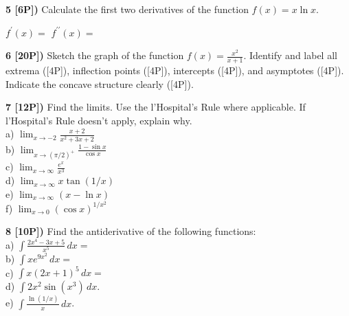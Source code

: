 \documentclass[12pt]{article}
\begin{document}
{\bf 5 [6P])} Calculate the first two derivatives of the function
$f(x) = x \ln x$.


\hfill${\displaystyle f^\prime(x) = }$\hspace{5cm} ${\displaystyle f^{\prime\prime}(x) =
}$\hspace{5cm}\hfill

\vspace{.2in}

{\bf 6 [20P])} Sketch the graph of the function
${\displaystyle f(x) = \frac{x^2}{x+1}}$. Identify and label all
extrema ([4P]), inflection points ([4P]), intercepts
([4P]), and asymptotes ([4P]). Indicate the concave structure
clearly ([4P]).

\vspace{.2in}

{\bf 7 [12P])}  Find the  
limits. Use the l'Hospital's Rule where applicable. If l'Hospital's Rule doesn't
apply, explain why.  
\\ 
a) $\displaystyle{\lim_{x\to -2} \frac{x+2}{x^2+3x+2} }$
\\ %

b) $\displaystyle{\lim_{x\to (\pi/2)^+} \frac{1-\sin x}{\cos x}
}$
\\

c) $\displaystyle{\lim_{x\to \infty}  \frac{e^x}{x^3}}$
\\

d)  $\displaystyle{\lim_{x\to \infty}  x\tan(1/x)}$
\\

e)  $\displaystyle{\lim_{x\to \infty}  (x- \ln x)}$
\\

f)  $\displaystyle{\lim_{x\to 0}  (\cos x)^{1/x^2}}$

\vspace{.2in}

{\bf 8 [10P])}  Find the antiderivative of the following 
functions:
\\ %
a) $\displaystyle{\int \frac{2x^4 - 3x + 5}{x^5}\, dx 
=}$
\\ %
b) $\displaystyle{\int x e^{9x^2}\, dx=}$
\\ %
c) $\displaystyle{\int x(2x + 1)^5 \, dx =}$
\\ %

d) $\displaystyle{\int 2x^2\sin (x^3)\, dx}$.
\\ %
e) $\displaystyle{\int \frac{\ln (1/x)}{x}\, dx}$.
\\ 
\end{document}
